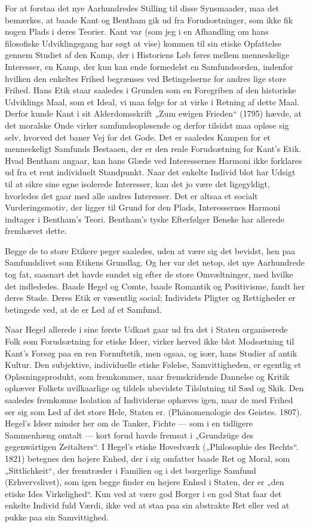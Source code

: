 \documentclass[12pt,a4paper,openany]{book}
\newcommand{\opage}[1]{\marginnote{\footnotesize\textit{[#1]}}}
\begin{document}
For at forstaa det nye Aarhundredes Stilling til disse Synsmaader,
maa det bemærkes, at baade Kant og Bentham gik ud fra Forudsætninger,
som ikke fik nogen Plads i deres Teorier. Kant var (som
jeg i en Afhandling om hans filosofiske Udviklingsgang har søgt at
vise) kommen til sin etiske Opfattelse gennem Studiet af den Kamp,
der i Historiens Løb føres mellem menneskelige Interesser, en Kamp,
der kun kan ende formedelst en Samfundsorden, indenfor hvilken
den enkeltes Frihed begrænses ved Betingelserne for andres lige
store Frihed. Hans Etik staar saaledes i Grunden som en Foregriben
af den historiske Udviklings Maal, som et Ideal, vi maa følge for at
virke i Retning af dette Maal. Derfor kunde Kant i sit Alderdomsskrift
„Zum ewigen Frieden“ (1795) hævde, at det moralske Onde
virker samfundsopløsende og derfor tilsidst maa opløse sig selv,
hvorved det baner Vej for det Gode. Det er saaledes Kampen for et
menneskeligt Samfunds Bestaaen, der er den reale Forudsætning for
Kant’s Etik. Hvad Bentham angaar, kan hans Glæde ved Interessernes
Harmoni ikke forklares ud fra et rent individuelt Standpunkt.
Naar det enkelte Individ blot har Udsigt til at sikre sine egne isolerede
Interesser, kan det jo være det ligegyldigt, hvorledes det gaar
med alle andres Interesser. Det er altsaa et socialt Vurderingsmotiv,
der ligger til Grund for den Plads, Interessernes Harmoni indtager i
Bentham’s Teori. Bentham’s tyske Efterfølger Beneke har allerede
fremhævet dette.

Begge de to store Etikere peger saaledes, uden at være sig det
\opage{68}bevidst, hen paa Samfundslivet som Etikens Grundlag. Og her var
det netop, det nye Aarhundrede tog fat, saasnart det havde sundet
sig efter de store Omvæltninger, med hvilke det indlededes.
Baade Hegel og Comte, baade Romantik og Positivisme, fandt her
deres Stade. Deres Etik er væsentlig social; Individets Pligter og
Rettigheder er betingede ved, at de er Led af et Samfund.

Naar Hegel allerede i sine første Udkast gaar ud fra det i Staten
organiserede Folk som Forudsætning for etiske Ideer, virker herved
ikke blot Modsætning til Kant’s Forsøg paa en ren Fornuftetik, men
ogsaa, og især, hans Studier af antik Kultur. Den subjektive, individuelle
etiske Følelse, Samvittigheden, er egentlig et Opløsningsprodukt,
som fremkommer, naar fremskridende Dannelse og Kritik ophæver
Folkets uvilkaarlige og tildels ubevidste Tilslutning til Sæd
og Skik. Den saaledes fremkomne Isolation af Individerne ophæves
igen, naar de med Frihed ser sig som Led af det store Hele, Staten
er. (Phänomenologie des Geistes. 1807). Hegel’s Ideer minder her
om de Tanker, Fichte --- som i en tidligere Sammenhæng omtalt
--- kort forud havde fremsat i „Grundzüge des gegenwärtigen Zeitalters“.
I Hegel’s etiske Hovedværk („Philosophie des Rechts“. 1821)
betegnes den højere Enhed, der i sig omfatter baade Ret og Moral,
som „Sittlichkeit“, der fremtræder i Familien og i det borgerlige
Samfund (Erhvervslivet), som igen begge finder en højere Enhed i
Staten, der er „den etiske Ides Virkelighed“. Kun ved at være god
Borger i en god Stat faar det enkelte Individ fuld Værdi, ikke ved
at staa paa sin abstrakte Ret eller ved at pukke paa sin Samvittighed.
\end{document}
